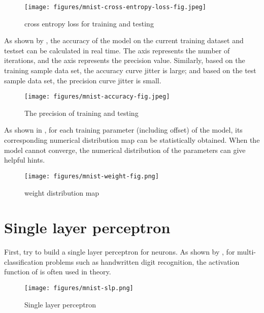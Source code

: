 \begin{content}
\begin{content}
\begin{figure}[H]
  \centering
  \texttt{[image: figures/mnist-cross-entropy-loss-fig.jpeg]}
  \caption{cross entropy loss for training and testing}
  \label{fig:mnist-cross-entropy-loss-fig}
\end{figure}

As shown by , the accuracy of the model on the current training dataset and testset can be calculated in real time. The  axis represents the number of iterations, and the  axis represents the precision value. Similarly, based on the training sample data set, the accuracy curve jitter is large; and based on the test sample data set, the precision curve jitter is small.

\begin{figure}[H]
  \centering
  \texttt{[image: figures/mnist-accuracy-fig.jpeg]}
  \caption{The precision of training and testing}
  \label{fig:mnist-accuracy-fig}
\end{figure}

As shown in , for each training parameter (including offset) of the model, its corresponding numerical distribution map can be statistically obtained. When the model cannot converge, the numerical distribution of the parameters can give helpful hints.

\begin{figure}[H]
  \centering
  \texttt{[image: figures/mnist-weight-fig.png]}
  \caption{weight distribution map}
  \label{fig:mnist-weight-fig}
\end{figure}

\end{content}


\section{Single layer perceptron}
\begin{content}
First, try to build a single layer perceptron for  neurons. As shown by , for multi-classification problems such as handwritten digit recognition, the activation function of  is often used in theory.

\begin{figure}[H]
  \centering
  \texttt{[image: figures/mnist-slp.png]}
  \caption{Single layer perceptron}
  \label{fig:mnist-slp}
\end{figure}



\end{content}
\end{content}
